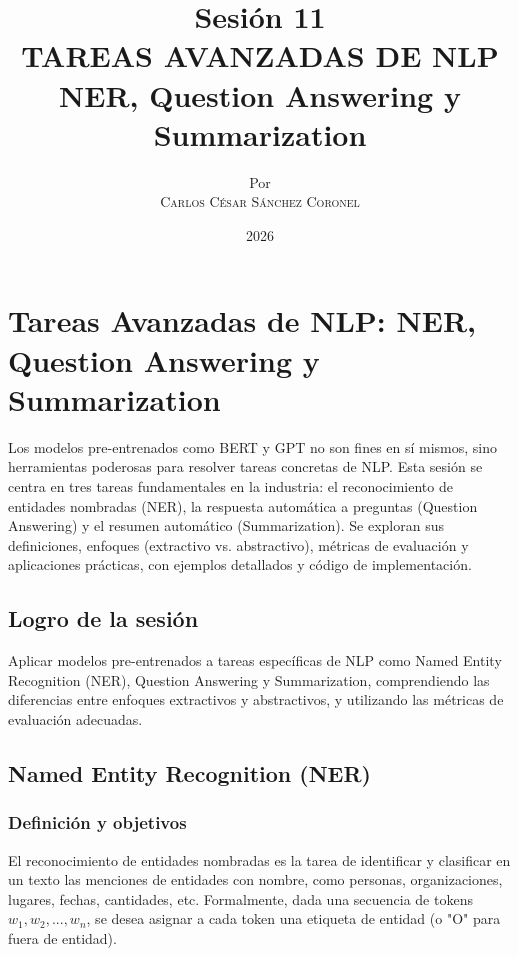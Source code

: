 \documentclass[12pt,a4paper,openany,oneside]{book}
\title{
    \textbf{Sesión 11} \\ 
    \Huge \textbf{TAREAS AVANZADAS DE NLP} \\
    \Large NER, Question Answering y Summarization
}
\author{
    \small Por \\ \vspace{0.2cm}
    \Large \textsc{Carlos César Sánchez Coronel}
}
\date{2026}
\begin{document}
\maketitle
\tableofcontents
{}

\chapter{Tareas Avanzadas de NLP: NER, Question Answering y Summarization}

Los modelos pre-entrenados como BERT y GPT no son fines en sí mismos, sino herramientas poderosas para resolver tareas concretas de NLP. Esta sesión se centra en tres tareas fundamentales en la industria: el reconocimiento de entidades nombradas (NER), la respuesta automática a preguntas (Question Answering) y el resumen automático (Summarization). Se exploran sus definiciones, enfoques (extractivo vs. abstractivo), métricas de evaluación y aplicaciones prácticas, con ejemplos detallados y código de implementación.

\section{Logro de la sesión}
Aplicar modelos pre-entrenados a tareas específicas de NLP como Named Entity Recognition (NER), Question Answering y Summarization, comprendiendo las diferencias entre enfoques extractivos y abstractivos, y utilizando las métricas de evaluación adecuadas.

\section{Named Entity Recognition (NER)}

\subsection{Definición y objetivos}
El reconocimiento de entidades nombradas es la tarea de identificar y clasificar en un texto las menciones de entidades con nombre, como personas, organizaciones, lugares, fechas, cantidades, etc. Formalmente, dada una secuencia de tokens \(w_1, w_2, ..., w_n\), se desea asignar a cada token una etiqueta de entidad (o "O" para fuera de entidad).
\end{document}
